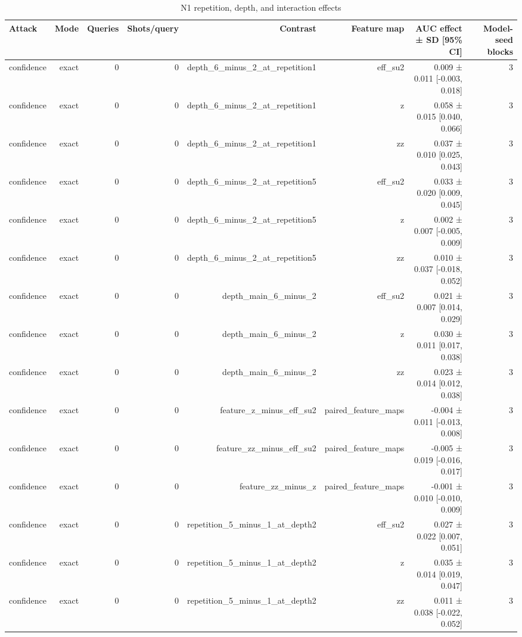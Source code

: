 \begin{table}
\caption{N1 repetition, depth, and interaction effects}
\label{tab:satml_noise_n1_effects}
\begin{tabular}{lrrrrrrr}
\toprule
Attack & Mode & Queries & Shots/query & Contrast & Feature map & AUC effect ± SD [95\% CI] & Model-seed blocks \\
\midrule
confidence & exact & 0 & 0 & depth\_6\_minus\_2\_at\_repetition1 & eff\_su2 & 0.009 ± 0.011 [-0.003, 0.018] & 3 \\
confidence & exact & 0 & 0 & depth\_6\_minus\_2\_at\_repetition1 & z & 0.058 ± 0.015 [0.040, 0.066] & 3 \\
confidence & exact & 0 & 0 & depth\_6\_minus\_2\_at\_repetition1 & zz & 0.037 ± 0.010 [0.025, 0.043] & 3 \\
confidence & exact & 0 & 0 & depth\_6\_minus\_2\_at\_repetition5 & eff\_su2 & 0.033 ± 0.020 [0.009, 0.045] & 3 \\
confidence & exact & 0 & 0 & depth\_6\_minus\_2\_at\_repetition5 & z & 0.002 ± 0.007 [-0.005, 0.009] & 3 \\
confidence & exact & 0 & 0 & depth\_6\_minus\_2\_at\_repetition5 & zz & 0.010 ± 0.037 [-0.018, 0.052] & 3 \\
confidence & exact & 0 & 0 & depth\_main\_6\_minus\_2 & eff\_su2 & 0.021 ± 0.007 [0.014, 0.029] & 3 \\
confidence & exact & 0 & 0 & depth\_main\_6\_minus\_2 & z & 0.030 ± 0.011 [0.017, 0.038] & 3 \\
confidence & exact & 0 & 0 & depth\_main\_6\_minus\_2 & zz & 0.023 ± 0.014 [0.012, 0.038] & 3 \\
confidence & exact & 0 & 0 & feature\_z\_minus\_eff\_su2 & paired\_feature\_maps & -0.004 ± 0.011 [-0.013, 0.008] & 3 \\
confidence & exact & 0 & 0 & feature\_zz\_minus\_eff\_su2 & paired\_feature\_maps & -0.005 ± 0.019 [-0.016, 0.017] & 3 \\
confidence & exact & 0 & 0 & feature\_zz\_minus\_z & paired\_feature\_maps & -0.001 ± 0.010 [-0.010, 0.009] & 3 \\
confidence & exact & 0 & 0 & repetition\_5\_minus\_1\_at\_depth2 & eff\_su2 & 0.027 ± 0.022 [0.007, 0.051] & 3 \\
confidence & exact & 0 & 0 & repetition\_5\_minus\_1\_at\_depth2 & z & 0.035 ± 0.014 [0.019, 0.047] & 3 \\
confidence & exact & 0 & 0 & repetition\_5\_minus\_1\_at\_depth2 & zz & 0.011 ± 0.038 [-0.022, 0.052] & 3 \\

\end{tabular}
\end{table}
